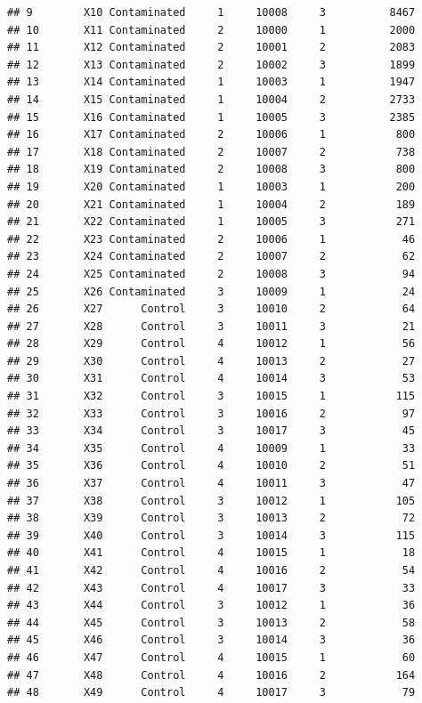 \documentclass[12pt]{beamer}\usepackage[]{graphicx}\usepackage[]{color}
\makeatletter
\newenvironment{kframe}{%
 \def\at@end@of@kframe{}%
 \ifinner\ifhmode%
  \def\at@end@of@kframe{\end{minipage}}%
  \begin{minipage}{\columnwidth}%
 \fi\fi%
 \def\FrameCommand##1{\hskip\@totalleftmargin \hskip-\fboxsep
 \colorbox{shadecolor}{##1}\hskip-\fboxsep
     \hskip-\linewidth \hskip-\@totalleftmargin \hskip\columnwidth}%
 \MakeFramed {\advance\hsize-\width
   \@totalleftmargin\z@ \linewidth\hsize
   \@setminipage}}%
 {\par\unskip\endMakeFramed%
 \at@end@of@kframe}
\newenvironment{knitrout}{}{} %
\makeatother
\begin{document}
\begin{frame}[fragile]
\begin{knitrout}
\begin{kframe}
\begin{verbatim}
## 9        X10 Contaminated     1     10008     3          8467
## 10       X11 Contaminated     2     10000     1          2000
## 11       X12 Contaminated     2     10001     2          2083
## 12       X13 Contaminated     2     10002     3          1899
## 13       X14 Contaminated     1     10003     1          1947
## 14       X15 Contaminated     1     10004     2          2733
## 15       X16 Contaminated     1     10005     3          2385
## 16       X17 Contaminated     2     10006     1           800
## 17       X18 Contaminated     2     10007     2           738
## 18       X19 Contaminated     2     10008     3           800
## 19       X20 Contaminated     1     10003     1           200
## 20       X21 Contaminated     1     10004     2           189
## 21       X22 Contaminated     1     10005     3           271
## 22       X23 Contaminated     2     10006     1            46
## 23       X24 Contaminated     2     10007     2            62
## 24       X25 Contaminated     2     10008     3            94
## 25       X26 Contaminated     3     10009     1            24
## 26       X27      Control     3     10010     2            64
## 27       X28      Control     3     10011     3            21
## 28       X29      Control     4     10012     1            56
## 29       X30      Control     4     10013     2            27
## 30       X31      Control     4     10014     3            53
## 31       X32      Control     3     10015     1           115
## 32       X33      Control     3     10016     2            97
## 33       X34      Control     3     10017     3            45
## 34       X35      Control     4     10009     1            33
## 35       X36      Control     4     10010     2            51
## 36       X37      Control     4     10011     3            47
## 37       X38      Control     3     10012     1           105
## 38       X39      Control     3     10013     2            72
## 39       X40      Control     3     10014     3           115
## 40       X41      Control     4     10015     1            18
## 41       X42      Control     4     10016     2            54
## 42       X43      Control     4     10017     3            33
## 43       X44      Control     3     10012     1            36
## 44       X45      Control     3     10013     2            58
## 45       X46      Control     3     10014     3            36
## 46       X47      Control     4     10015     1            60
## 47       X48      Control     4     10016     2           164
## 48       X49      Control     4     10017     3            79

\end{verbatim}
\end{kframe}
\end{knitrout}
\end{frame}
\end{document}
